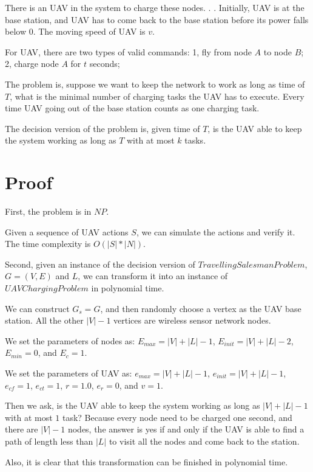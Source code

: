 There is an UAV in the system to charge these nodes. .   . Initially, UAV is at the base station, and UAV has to come back to the base station before its power falls below $0$. The moving speed of UAV is $v$.

For UAV, there are two types of valid commands:
1, fly from node $A$ to node $B$;
2, charge node $A$ for $t$ seconds;

The problem is, suppose we want to keep the network to work as long as time of $T$, what is the minimal number of charging tasks the UAV has to execute. Every time UAV going out of the base station counts as one charging task.

The decision version of the problem is, given time of $T$, is the UAV able to keep the system working as long as $T$ with at most $k$ tasks.
\section{Proof}

First, the problem is in $NP$.

Given a sequence of UAV actions $S$, we can simulate the actions and verify it. The time complexity is $O(|S| * |N|)$.

Second, given an instance of the decision version of $Travelling Salesman Problem$, $G = (V, E)$ and $L$, we can transform it into an instance of $UAV Charging Problem$ in polynomial time.

We can construct $G_s = G$, and then randomly choose a vertex as the UAV base station. All the other $|V|-1$ vertices are wireless sensor network nodes.

We set the parameters of nodes as: $E_{max} = |V| + |L| - 1$, $E_{init} = |V| + |L| - 2$, $E_{min} = 0$, and $E_{c} = 1$.

We set the parameters of UAV as: $e_{max} = |V| + |L| - 1$, $e_{init} = |V| + |L| - 1$, $e_{cf} = 1$, $e_{ct} = 1$, $r = 1.0$, $e_r = 0$, and $v = 1$.

Then we ask, is the UAV able to keep the system working as long as $|V| + |L| - 1$ with at most $1$ task? Because every node need to be charged one second, and there are $|V|-1$ nodes, the answer is yes if and only if the UAV is able to find a path of length less than $|L|$ to visit all the nodes and come back to the station.

Also, it is clear that this transformation can be finished in polynomial time.
